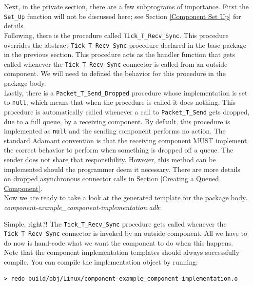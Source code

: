 Next, in the private section, there are a few subprograms of importance. First the \texttt{Set\_Up} function will not be discussed here; see Section \ref{Component Set Up} for details. \\

Following, there is the procedure called \texttt{Tick\_T\_Recv\_Sync}. This procedure overrides the abstract \texttt{Tick\_T\_Recv\_Sync} procedure declared in the base package in the previous section. This procedure acts as the handler function that gets called whenever the \texttt{Tick\_T\_Recv\_Sync} connector is called from an outside component. We will need to defined the behavior for this procedure in the package body. \\

Lastly, there is a \texttt{Packet\_T\_Send\_Dropped} procedure whose implementation is set to \texttt{null}, which means that when the procedure is called it does nothing. This procedure is automatically called whenever a call to \texttt{Packet\_T\_Send} gets dropped, due to a full queue, by a receiving component. By default, this procedure is implemented as \texttt{null} and the sending component performs no action. The standard Adamant convention is that the receiving component MUST implement the correct behavior to perform when something is dropped off a queue. The sender does not share that responsibility. However, this method can be implemented should the programmer deem it necessary. There are more details on dropped asynchronous connector calls in Section \ref{Creating a Queued Component}. \\

Now we are ready to take a look at the generated template for the package body. \\

\textit{component-example\_component-implementation.adb}:

Simple, right?! The \texttt{Tick\_T\_Recv\_Sync} procedure gets called whenever the \texttt{Tick\_T\_Recv\_Sync} connector is invoked by an outside component. All we have to do now is hand-code what we want the component to do when this happens. \\

Note that the component implementation templates should always successfully compile. You can compile the implementation object by running:

\vspace{5mm} %
\begin{verbatim}
> redo build/obj/Linux/component-example_component-implementation.o
\end{verbatim}
\vspace{5mm} %

